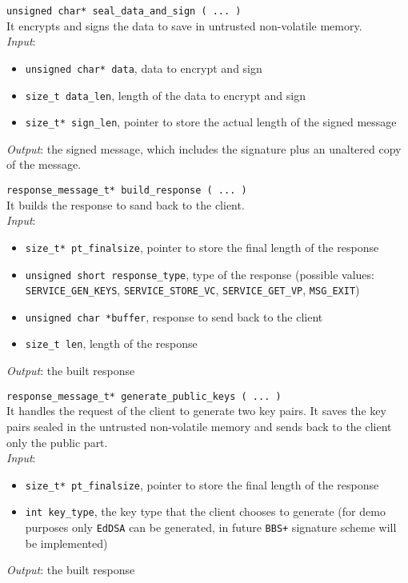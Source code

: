 \noindent
\texttt{unsigned char* seal\_data\_and\_sign ( ... )}\\
It encrypts and signs the data to save in untrusted non-volatile memory. \\
\textit{Input}:
\begin{itemize}[noitemsep,nolistsep]
  \item \texttt{unsigned char* data}, data to encrypt and sign
  \item \texttt{size\_t data\_len}, length of the data to encrypt and sign
  \item \texttt{size\_t* sign\_len}, pointer to store the actual length of the signed message
\end{itemize}
\textit{Output}: the signed message, which includes the signature plus an unaltered copy of the message. 


\noindent
\texttt{response\_message\_t* build\_response ( ... )}\\
It builds the response to sand back to the client. \\
\textit{Input}:
\begin{itemize}[noitemsep,nolistsep]
\item \texttt{size\_t* pt\_finalsize}, pointer to store the final length of the response
\item \texttt{unsigned short response\_type}, type of the response (possible values: \texttt{SERVICE\_\-GEN\_KEYS}, \texttt{SERVICE\_STORE\_VC}, \texttt{SERVICE\_GET\_VP}, \texttt{MSG\_EXIT})
\item \texttt{unsigned char *buffer}, response to send back to the client
\item \texttt{size\_t len}, length of the response
\end{itemize}
\textit{Output}: the built response 


\noindent
\texttt{response\_message\_t* generate\_public\_keys ( ... )}\\
It handles the request of the client to generate two key pairs. It saves the key pairs sealed in the untrusted non-volatile memory and sends back to the client only the public part. \\ 
\textit{Input}:
\begin{itemize}[noitemsep,nolistsep]
\item \texttt{size\_t* pt\_finalsize}, pointer to store the final length of the response
\item \texttt{int key\_type}, the key type that the client chooses to generate (for demo purposes only \texttt{EdDSA} can be generated, in future \texttt{BBS+} signature scheme will be implemented)
\end{itemize}
\textit{Output}: the built response 

